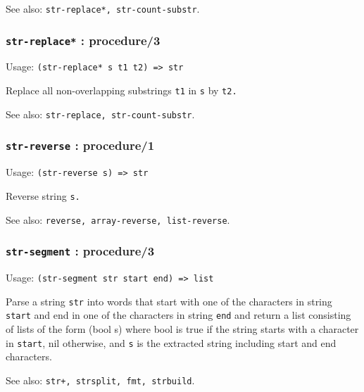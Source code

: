 \documentclass[
]{article}
\newcommand{\passthrough}[1]{#1}
\begin{document}
See also: \passthrough{\lstinline!str-replace*, str-count-substr!}.

\hypertarget{str-replace-procedure3}{%
\subsubsection{\texorpdfstring{\texttt{str-replace*} :
procedure/3}{str-replace* : procedure/3}}\label{str-replace-procedure3}}

Usage: \passthrough{\lstinline!(str-replace* s t1 t2) => str!}

Replace all non-overlapping substrings \passthrough{\lstinline!t1!} in
\passthrough{\lstinline!s!} by \passthrough{\lstinline!t2.!}

See also: \passthrough{\lstinline!str-replace, str-count-substr!}.

\hypertarget{str-reverse-procedure1}{%
\subsubsection{\texorpdfstring{\texttt{str-reverse} :
procedure/1}{str-reverse : procedure/1}}\label{str-reverse-procedure1}}

Usage: \passthrough{\lstinline!(str-reverse s) => str!}

Reverse string \passthrough{\lstinline!s.!}

See also:
\passthrough{\lstinline!reverse, array-reverse, list-reverse!}.

\hypertarget{str-segment-procedure3}{%
\subsubsection{\texorpdfstring{\texttt{str-segment} :
procedure/3}{str-segment : procedure/3}}\label{str-segment-procedure3}}

Usage: \passthrough{\lstinline!(str-segment str start end) => list!}

Parse a string \passthrough{\lstinline!str!} into words that start with
one of the characters in string \passthrough{\lstinline!start!} and end
in one of the characters in string \passthrough{\lstinline!end!} and
return a list consisting of lists of the form (bool s) where bool is
true if the string starts with a character in
\passthrough{\lstinline!start!}, nil otherwise, and
\passthrough{\lstinline!s!} is the extracted string including start and
end characters.

See also: \passthrough{\lstinline!str+, strsplit, fmt, strbuild!}.
\end{document}
